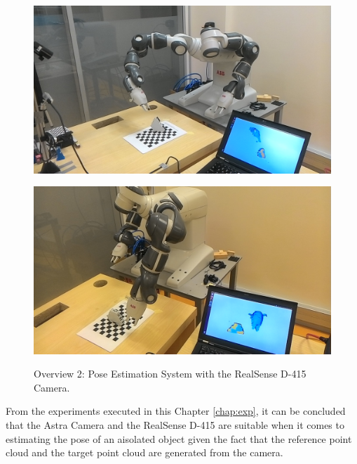 \begin{figure}[htp]
\begin{center}
{
  \includegraphics[clip,width=0.8\columnwidth]{realnew/5.jpg}
}
\end{center}
\begin{center}
{
  \includegraphics[clip,width=0.8\columnwidth]{realnew/4.jpg}
}
\end{center}


\caption{Overview 2: Pose Estimation System with the RealSense D-415 Camera.}
\label{mami2}
\end{figure}


From the experiments executed in this Chapter \ref{chap:exp}, it can be concluded that the Astra Camera and the RealSense D-415 are suitable when it comes to estimating the pose of an aisolated object given the fact that the reference point cloud and the target point cloud are generated from the camera.  